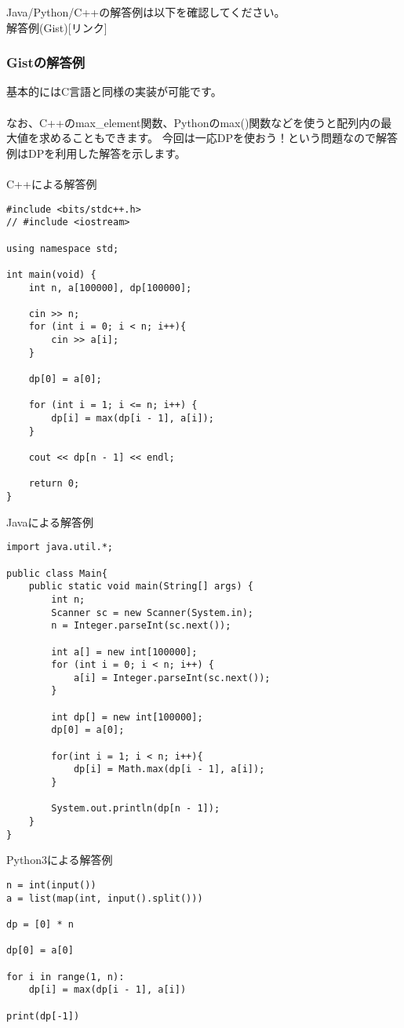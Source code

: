 \noindent
Java/Python/C++の解答例は以下を確認してください。\\
解答例(Gist)[リンク]

\clearpage

\subsubsection{Gistの解答例}
\noindent
基本的にはC言語と同様の実装が可能です。
\\ \\ \noindent
なお、C++のmax\_element関数、Pythonのmax()関数などを使うと配列内の最大値を求めることもできます。 今回は一応DPを使おう！という問題なので解答例はDPを利用した解答を示します。
\\ \\
\noindent
C++による解答例
\begin{lstlisting}[style = customCpp]
#include <bits/stdc++.h>
// #include <iostream>

using namespace std;

int main(void) {
    int n, a[100000], dp[100000];

    cin >> n;
    for (int i = 0; i < n; i++){
        cin >> a[i];
    } 

    dp[0] = a[0];

    for (int i = 1; i <= n; i++) {
        dp[i] = max(dp[i - 1], a[i]);
    }

    cout << dp[n - 1] << endl;

    return 0;
}
\end{lstlisting}

\noindent
Javaによる解答例
\begin{lstlisting}[style = customJava]
import java.util.*;

public class Main{
    public static void main(String[] args) {
        int n;
        Scanner sc = new Scanner(System.in);
        n = Integer.parseInt(sc.next());

        int a[] = new int[100000];
        for (int i = 0; i < n; i++) {
            a[i] = Integer.parseInt(sc.next());
        }

        int dp[] = new int[100000];
        dp[0] = a[0];

        for(int i = 1; i < n; i++){
            dp[i] = Math.max(dp[i - 1], a[i]);
        }

        System.out.println(dp[n - 1]);
    }
}
\end{lstlisting}

\noindent
Python3による解答例
\begin{lstlisting}[style = customPy]
n = int(input())
a = list(map(int, input().split()))

dp = [0] * n

dp[0] = a[0]

for i in range(1, n):
    dp[i] = max(dp[i - 1], a[i])
    
print(dp[-1])
\end{lstlisting}

